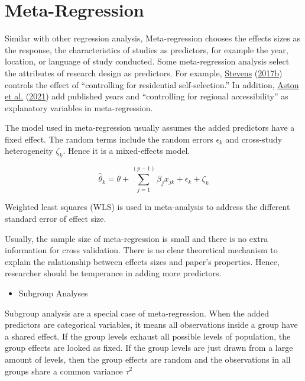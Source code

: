 \documentclass[
  11pt,
  openany]{memoir}
\providecommand{\tightlist}{%
  \setlength{\itemsep}{0pt}\setlength{\parskip}{0pt}}
\begin{document}
\hypertarget{meta-regression}{%
\section{Meta-Regression}\label{meta-regression}}

Similar with other regression analysis, Meta-regression chooses the effects sizes as the response, the characteristics of studies as predictors, for example the year, location, or language of study conducted.
Some meta-regression analysis select the attributes of research design as predictors. For example, \protect\hyperlink{ref-stevensResponseCommentariesDoes2017}{Stevens} (\protect\hyperlink{ref-stevensResponseCommentariesDoes2017}{2017b}) controls the effect of ``controlling for residential self-selection.''
In addition, \protect\hyperlink{ref-astonExploringBuiltEnvironment2021}{Aston et al.} (\protect\hyperlink{ref-astonExploringBuiltEnvironment2021}{2021}) add published years and ``controlling for regional accessibility'' as explanatory variables in meta-regression.

The model used in meta-regression usually assumes the added predictors have a fixed effect. The random terms include the random errors \(\epsilon_k\) and cross-study heterogeneity \(\zeta_k\). Hence it is a mixed-effects model.

\begin{equation}
\hat\theta_k = \theta + \sum_{j=1}^{(p-1)}\beta_j x_{jk} + \epsilon_k+\zeta_k
\end{equation}

Weighted least squares (WLS) is used in meta-analysis to address the different standard error of effect size.

Usually, the sample size of meta-regression is small and there is no extra information for cross validation.
There is no clear theoretical mechanism to explain the ralationship between effects sizes and paper's properties.
Hence, researcher should be temperance in adding more predictors.

\begin{itemize}
\tightlist
\item
  Subgroup Analyses
\end{itemize}

Subgroup analysis are a special case of meta-regression.
When the added predictors are categorical variables, it means all observations inside a group have a shared effect.
If the group levels exhaust all possible levels of population, the group effects are looked as fixed.
If the group levels are just drawn from a large amount of levels, then the group effects are random and the observations in all groups share a common variance \(\tau^2\)
\end{document}

